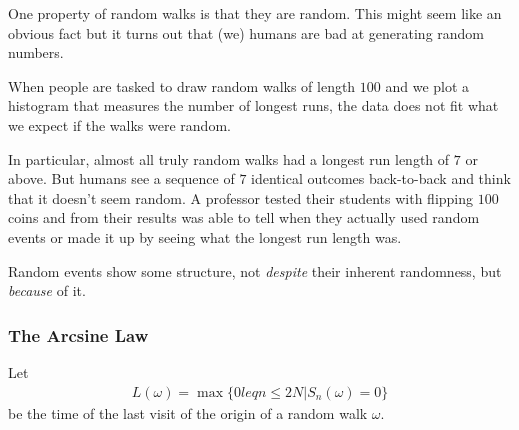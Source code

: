 One property of random walks is that they are random.
This might seem like an obvious fact but it turns out that (we) humans are bad at generating random numbers.

When people are tasked to draw random walks of length $100$ and we plot a histogram that measures the number of longest runs, the data does not fit what we expect if the walks were random.

In particular, almost all truly random walks had a longest run length of $7$ or above.
But humans see a sequence of $7$ identical outcomes back-to-back and think that it doesn't seem random.
A professor tested their students with flipping $100$ coins and from their results was able to tell when they actually used random events or made it up by seeing what the longest run length was.

Random events show some structure, not \emph{despite} their inherent randomness, but \emph{because} of it.

\subsubsection{The Arcsine Law}
Let
\begin{align*}
  L(\omega) = \max \{0 leq n \leq 2N \big\vert S_n(\omega) = 0\}
\end{align*}
be the time of the last visit of the origin of a random walk $\omega$.

